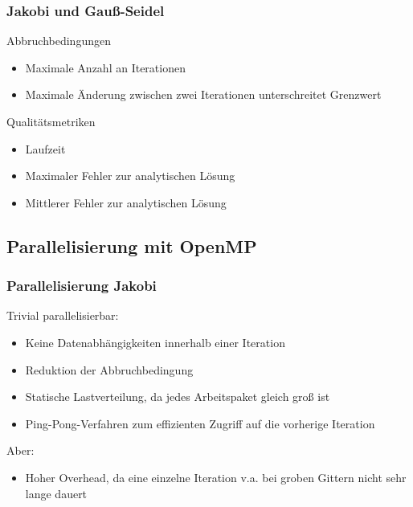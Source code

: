 \documentclass{beamer}
\begin{document}
\begin{frame}
    \frametitle{Jakobi und Gauß-Seidel}
    \begin{block}{Abbruchbedingungen}
        \begin{itemize}
            \item Maximale Anzahl an Iterationen
            \item Maximale Änderung zwischen zwei Iterationen unterschreitet Grenzwert
        \end{itemize}
    \end{block}
    \begin{block}{Qualitätsmetriken}
        \begin{itemize}
            \item Laufzeit
            \item Maximaler Fehler zur analytischen Lösung
            \item Mittlerer Fehler zur analytischen Lösung
        \end{itemize}
    \end{block}
\end{frame}

\subsection{Parallelisierung mit OpenMP}
\begin{frame}
    \frametitle{Parallelisierung Jakobi}
    Trivial parallelisierbar:
    \begin{itemize}
        \item Keine Datenabhängigkeiten innerhalb einer Iteration
        \item Reduktion der Abbruchbedingung
        \item Statische Lastverteilung, da jedes Arbeitspaket gleich groß ist
        \item Ping-Pong-Verfahren zum effizienten Zugriff auf die vorherige Iteration
    \end{itemize}
    Aber:
    \begin{itemize}
        \item Hoher Overhead, da eine einzelne Iteration v.a. bei groben Gittern nicht sehr lange dauert
    \end{itemize}
\end{frame}
\end{document}

